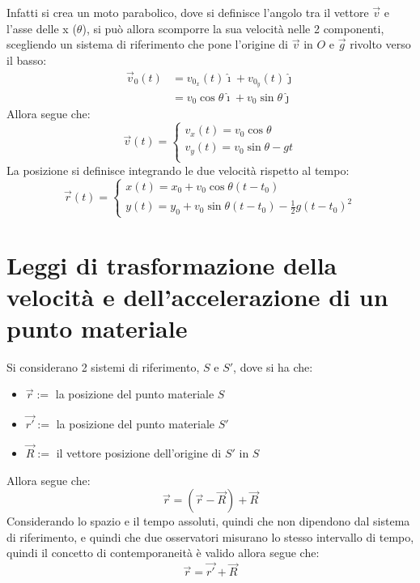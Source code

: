 \documentclass[11pt, a4paper, openright]{book}
\theoremstyle{plain}
\theoremstyle{definition}
\begin{document}
Infatti si crea un moto parabolico, dove si definisce l'angolo tra il vettore $\vec{v}$ e l'asse delle x ($\theta$), si può allora scomporre la sua velocità nelle 2 componenti, scegliendo un sistema di riferimento che pone l'origine di $\vec{v}$ in $O$ e $\vec{g}$ rivolto verso il basso:
\begin{align}
    \vec{v}_0(t) & = v_{0_x}(t)\hat{\imath} + v_{0_y}(t)\hat{\jmath} \\
    & = v_0\cos\theta \hat{\imath} + v_0\sin\theta\hat{\jmath}
\end{align}
Allora segue che:
\[\vec{v}(t) = \begin{cases}
    v_x(t) = v_0\cos\theta \\
    v_y(t) = v_0\sin\theta - gt\\
\end{cases}\]
La posizione si definisce integrando le due velocità rispetto al tempo:
\[\vec{r}(t) = \begin{cases}
    x(t) = x_0 + v_0\cos\theta (t - t_0) \\                                           
    y(t) = y_0 + v_0\sin\theta (t - t_0) - \frac{1}{2}g(t - t_0)^2
\end{cases}\]

\newpage

\section[Velocità e accelerazioni relative]{Leggi di trasformazione della velocità e dell'accelerazione di un punto materiale}
Si considerano 2 sistemi di riferimento, $S$ e $S'$, dove si ha che:
\begin{itemize}
    \item $\vec{r} :=$ la posizione del punto materiale $S$
    \item $\vec{r'} :=$ la posizione del punto materiale $S'$
    \item $\vec{R} :=$ il vettore posizione dell'origine di $S'$ in $S$
\end{itemize}
Allora segue che:
\[\vec{r} = (\vec{r} - \vec{R}) + \vec{R}\]
Considerando lo spazio e il tempo assoluti, quindi che non dipendono dal sistema di riferimento, e quindi che due osservatori misurano lo stesso intervallo di tempo, quindi il concetto di contemporaneità è valido allora segue che:
\[\vec{r} = \vec{r'} + \vec{R}\]
\end{document}
